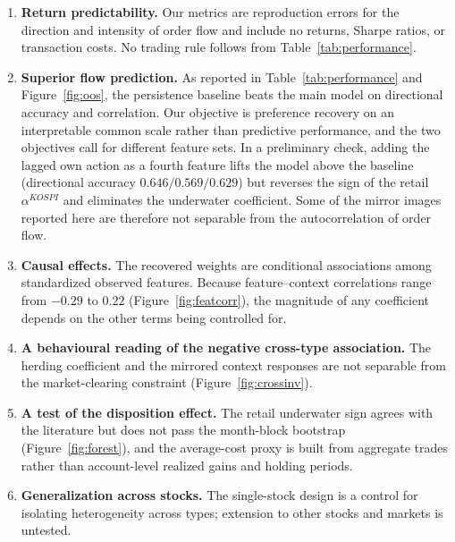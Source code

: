 \begin{enumerate}
\item \textbf{Return predictability.} Our metrics are reproduction errors for
the direction and intensity of order flow and include no returns, Sharpe ratios,
or transaction costs. No trading rule follows from
Table~\ref{tab:performance}.

\item \textbf{Superior flow prediction.} As reported in
Table~\ref{tab:performance} and Figure~\ref{fig:oos}, the persistence baseline
beats the main model on directional accuracy and correlation. Our objective is
preference recovery on an interpretable common scale rather than predictive
performance, and the two objectives call for different feature sets. In a
preliminary check, adding the lagged own action as a fourth feature lifts the
model above the baseline (directional accuracy $0.646/0.569/0.629$) but reverses
the sign of the retail $\alpha^{KOSPI}$ and eliminates the underwater
coefficient. Some of the mirror images reported here are therefore not separable
from the autocorrelation of order flow.

\item \textbf{Causal effects.} The recovered weights are conditional
associations among standardized observed features. Because feature--context
correlations range from $-0.29$ to $0.22$ (Figure~\ref{fig:featcorr}), the
magnitude of any coefficient depends on the other terms being controlled for.

\item \textbf{A behavioural reading of the negative cross-type association.} The
herding coefficient and the mirrored context responses are not separable from
the market-clearing constraint (Figure~\ref{fig:crossinv}).

\item \textbf{A test of the disposition effect.} The retail underwater sign
agrees with the literature but does not pass the month-block bootstrap
(Figure~\ref{fig:forest}), and the average-cost proxy is built from aggregate
trades rather than account-level realized gains and holding periods.

\item \textbf{Generalization across stocks.} The single-stock design is a
control for isolating heterogeneity across types; extension to other stocks and
markets is untested.
\end{enumerate}

\appendix

